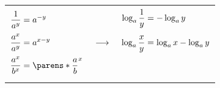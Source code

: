 \begin{multicols}{2}
\begin{CheatsheetEntryFrame}
\begin{center}
\begin{tabularx}{\textwidth}{Ccc}
            $\W
                        \begin{aligned}
                            \Z \frac{1}{a^y}   &= a^{-y} \\
                            \Z \frac{a^x}{a^y} &= a^{x-y} \\
                            \Z \frac{a^x}{b^x} &= \parens*{\frac{a}{b}}^x
                        \end{aligned}
            $
                &
                    $\W
                        \begin{gathered}
                            \Z \\
                            \Z \longrightarrow \\
                            \Z
                        \end{gathered}
                    $
                &
                    $\W
                        \begin{aligned}
                            \Z \log_a{\frac{1}{y}} &= -\log_a{y} \\
                            \Z \log_a{\frac{x}{y}} &= \log_a{x} - \log_a{y} \\
                            \Z &
                        \end{aligned}
                    $
                \\

            && %
                \\ %


\end{tabularx}
\end{center}
\end{CheatsheetEntryFrame}
\end{multicols}
